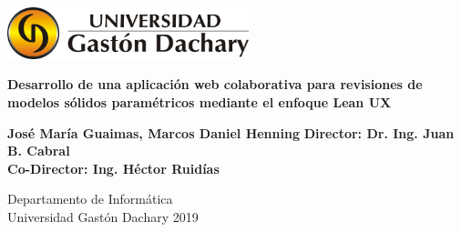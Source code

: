 

\thispagestyle{empty}
\begin{flushright}
\includegraphics[width=7cm]{Img/ugdlogo.jpg}
\end{flushright}	
\vskip40mm
\begin{center}

\huge\textbf{Desarrollo de una aplicación web colaborativa para revisiones de modelos sólidos paramétricos mediante el enfoque Lean UX}
\vskip2mm



\vskip25mm
\vskip25mm

\Large\textbf{José María Guaimas, Marcos Daniel Henning}
\vskip5mm
\Large\textbf{Director: Dr. Ing. Juan B. Cabral}\\
\Large\textbf{Co-Director: Ing. Héctor Ruidías}
\normalsize
\end{center}
\vfill
\begin{flushright}
\large
Departamento de Informática \\
Universidad Gastón Dachary 2019\\
\addtocounter{page}{-1}
\end{flushright}		

\chapter*{} \thispagestyle{empty} \addtocounter{page}{-1}


	
